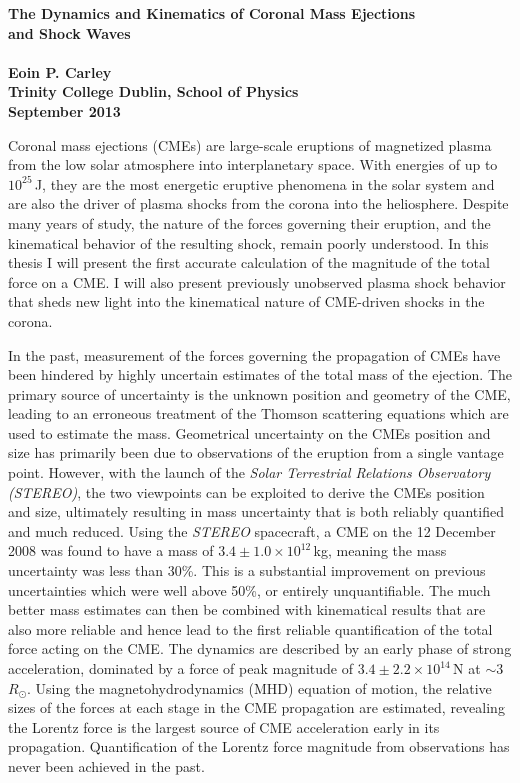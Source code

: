 \documentclass[11pt]{article}
\begin{document}
\begin{center}
{\large \bf The Dynamics and Kinematics of Coronal Mass Ejections  \\ and Shock Waves \\ ~ \\ Eoin P. Carley \\ Trinity College Dublin, School of Physics \\ September 2013}
\end{center}

Coronal mass ejections (CMEs) are large-scale eruptions of magnetized plasma from the low solar atmosphere into interplanetary space. With energies of up to $10^{25}$\,J, they are the most energetic eruptive phenomena in the solar system and are also the driver of plasma shocks from the corona into the heliosphere. Despite many years of study, the nature of the forces governing their eruption, and the kinematical behavior of the resulting shock, remain poorly understood. In this thesis I will present the first accurate calculation of the magnitude of the total force on a CME. I will also present previously unobserved plasma shock behavior that sheds new light into the kinematical nature of CME-driven shocks in the corona.

In the past, measurement of the forces governing the propagation of CMEs have been hindered by highly uncertain estimates of the total mass of the ejection. The primary source of uncertainty is the unknown position and geometry of the CME, leading to an erroneous treatment of the Thomson scattering equations which are used to estimate the mass. Geometrical uncertainty on the CMEs position and size has primarily been due to observations of the eruption from a single vantage point. However, with the launch of the {\it Solar Terrestrial Relations Observatory (STEREO)}, the two viewpoints can be exploited to derive the CMEs position and size, ultimately resulting in mass uncertainty that is both reliably quantified and much reduced. Using the {\it STEREO} spacecraft, a CME on the 12 December 2008 was found to have a mass of $3.4\pm1.0\times10^{12}$\,kg, meaning the mass uncertainty was less than 30\%. This is a substantial improvement on previous uncertainties which were well above 50\%, or entirely unquantifiable. The much better mass estimates can then be combined with kinematical results that are also more reliable and hence lead to the first reliable quantification of the total force acting on the CME. The dynamics are described by an early phase of strong acceleration, dominated by a force of peak magnitude of $3.4\pm2.2\times10^{14}$\,N at $\sim$3\,$R_{\odot}$. Using the magnetohydrodynamics (MHD) equation of motion, the relative sizes of the forces at each stage in the CME propagation are estimated, revealing the Lorentz force is the largest source of CME acceleration early in its propagation. Quantification of the Lorentz force magnitude from observations has never been achieved in the past.
\end{document}
